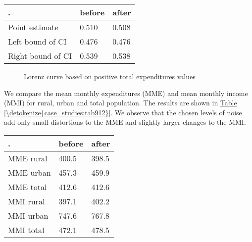 \documentclass[letterpaper,10pt,english]{sphinxmanual}
\begin{document}
\begin{savenotes}\sphinxattablestart
\centering
{}
\label{\detokenize{case_studies:tab911}}\label{\detokenize{case_studies:id25}}
\sphinxaftercaption
\begin{tabulary}{\linewidth}[t]{|T|T|T|}
\hline
\sphinxstyletheadfamily 
.
&\sphinxstyletheadfamily 
before
&\sphinxstyletheadfamily 
after
\\
\hline
Point estimate
&
0.510
&
0.508
\\
\hline
Left bound of CI
&
0.476
&
0.476
\\
\hline
Right bound of CI
&
0.539
&
0.538
\\
\hline
\end{tabulary}
\par
\sphinxattableend\end{savenotes}

\begin{figure}[htbp]
\centering
\capstart

\noindent{}
\caption{Lorenz curve based on positive total expenditures values}\label{\detokenize{case_studies:fig91}}\label{\detokenize{case_studies:id26}}\end{figure}

We compare the mean monthly expenditures (MME) and mean monthly income
(MMI) for rural, urban and total population. The results are shown in
\hyperref[\detokenize{case_studies:tab912}]{Table \ref{\detokenize{case_studies:tab912}}}. We observe that the chosen levels of noise add only small
distortions to the MME and slightly larger changes to the MMI.


\begin{savenotes}\sphinxattablestart
\centering
{}
\label{\detokenize{case_studies:tab912}}\label{\detokenize{case_studies:id27}}
\sphinxaftercaption
\begin{tabulary}{\linewidth}[t]{|T|T|T|}
\hline
\sphinxstyletheadfamily 
.
&\sphinxstyletheadfamily 
before
&\sphinxstyletheadfamily 
after
\\
\hline
MME rural
&
400.5
&
398.5
\\
\hline
MME urban
&
457.3
&
459.9
\\
\hline
MME total
&
412.6
&
412.6
\\
\hline
MMI rural
&
397.1
&
402.2
\\
\hline
MMI urban
&
747.6
&
767.8
\\
\hline
MMI total
&
472.1
&
478.5
\\
\hline
\end{tabulary}
\par
\sphinxattableend\end{savenotes}
\end{document}
